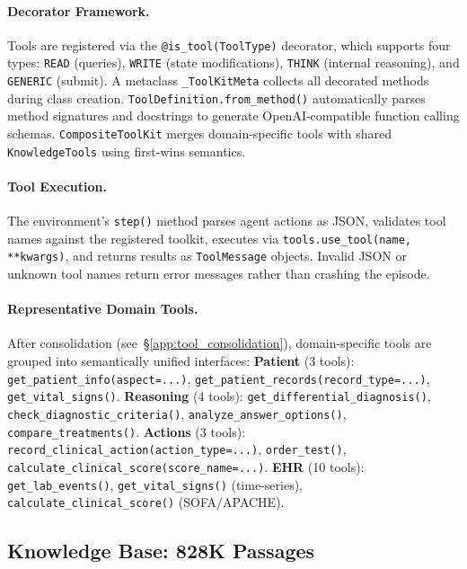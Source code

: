 \documentclass{article}
\begin{document}
\paragraph{Decorator Framework.}
Tools are registered via the \texttt{@is\_tool(ToolType)} decorator, which supports four types: \texttt{READ} (queries), \texttt{WRITE} (state modifications), \texttt{THINK} (internal reasoning), and \texttt{GENERIC} (submit). A metaclass \texttt{\_ToolKitMeta} collects all decorated methods during class creation. \texttt{ToolDefinition.from\_method()} automatically parses method signatures and docstrings to generate OpenAI-compatible function calling schemas. \texttt{CompositeToolKit} merges domain-specific tools with shared \texttt{KnowledgeTools} using first-wins semantics.

\paragraph{Tool Execution.}
The environment's \texttt{step()} method parses agent actions as JSON, validates tool names against the registered toolkit, executes via \texttt{tools.use\_tool(name, **kwargs)}, and returns results as \texttt{ToolMessage} objects. Invalid JSON or unknown tool names return error messages rather than crashing the episode.

\paragraph{Representative Domain Tools.}
After consolidation (see~\S\ref{app:tool_consolidation}), domain-specific tools are grouped into semantically unified interfaces:
\textbf{Patient} (3 tools): \texttt{get\_patient\_info(aspect=...)}, \texttt{get\_patient\_records(record\_type=...)}, \texttt{get\_vital\_signs()}.
\textbf{Reasoning} (4 tools): \texttt{get\_differential\_diagnosis()}, \texttt{check\_diagnostic\_criteria()}, \texttt{analyze\_answer\_options()}, \texttt{compare\_treatments()}.
\textbf{Actions} (3 tools): \texttt{record\_clinical\_action(action\_type=...)}, \texttt{order\_test()}, \texttt{calculate\_clinical\_score(score\_name=...)}.
\textbf{EHR} (10 tools): \texttt{get\_lab\_events()}, \texttt{get\_vital\_signs()} (time-series), \texttt{calculate\_clinical\_score()} (SOFA/APACHE).

\subsection{Knowledge Base: 828K Passages}
\end{document}
